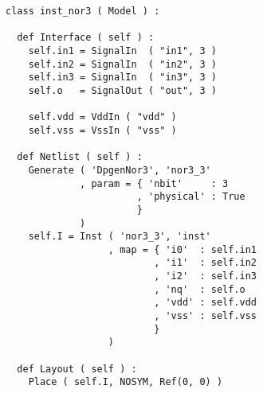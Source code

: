 \begin{itemize}
\begin{verbatim}
class inst_nor3 ( Model ) :

  def Interface ( self ) :
    self.in1 = SignalIn  ( "in1", 3 )
    self.in2 = SignalIn  ( "in2", 3 )
    self.in3 = SignalIn  ( "in3", 3 )
    self.o   = SignalOut ( "out", 3 )

    self.vdd = VddIn ( "vdd" )
    self.vss = VssIn ( "vss" )
    
  def Netlist ( self ) :
    Generate ( 'DpgenNor3', 'nor3_3'
             , param = { 'nbit'     : 3
                       , 'physical' : True
                       }
             )
    self.I = Inst ( 'nor3_3', 'inst'
                  , map = { 'i0'  : self.in1
                          , 'i1'  : self.in2
                          , 'i2'  : self.in3
                          , 'nq'  : self.o
                          , 'vdd' : self.vdd
                          , 'vss' : self.vss
                          }
                  )
    
  def Layout ( self ) :
    Place ( self.I, NOSYM, Ref(0, 0) )
\end{verbatim}
\end{itemize}
